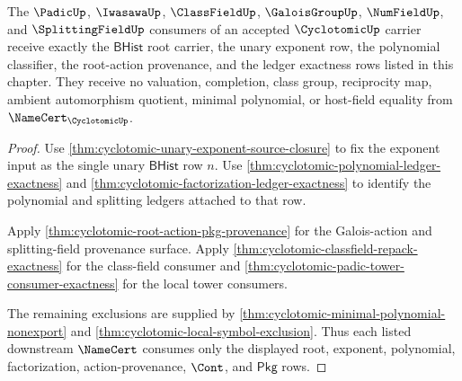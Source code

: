 \begin{theorem}
\label{thm:cyclotomic-downstream-namecert-obligation-packet}
The $\PadicUp$, $\IwasawaUp$, $\ClassFieldUp$, $\GaloisGroupUp$,
$\NumFieldUp$, and $\SplittingFieldUp$ consumers of an accepted
$\CyclotomicUp$ carrier receive exactly the $\mathsf{BHist}$ root carrier, the
unary exponent row, the polynomial classifier, the root-action provenance, and
the ledger exactness rows listed in this chapter. They receive no valuation,
completion, class group, reciprocity map, ambient automorphism quotient,
minimal polynomial, or host-field equality from $\NameCert_{\CyclotomicUp}$.
\end{theorem}
\begin{proof}
Use \autoref{thm:cyclotomic-unary-exponent-source-closure} to fix the exponent
input as the single unary $\mathsf{BHist}$ row $n$. Use
\autoref{thm:cyclotomic-polynomial-ledger-exactness} and
\autoref{thm:cyclotomic-factorization-ledger-exactness} to identify the
polynomial and splitting ledgers attached to that row.

Apply \autoref{thm:cyclotomic-root-action-pkg-provenance} for the
Galois-action and splitting-field provenance surface. Apply
\autoref{thm:cyclotomic-classfield-repack-exactness} for the class-field
consumer and \autoref{thm:cyclotomic-padic-tower-consumer-exactness} for the
local tower consumers.

The remaining exclusions are supplied by
\autoref{thm:cyclotomic-minimal-polynomial-nonexport} and
\autoref{thm:cyclotomic-local-symbol-exclusion}. Thus each listed downstream
$\NameCert$ consumes only the displayed root, exponent, polynomial,
factorization, action-provenance, $\Cont$, and $\mathsf{Pkg}$ rows.
\end{proof}
